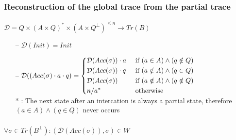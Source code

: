 \documentclass{beamer}
\begin{document}
\begin{frame}
\frametitle{Reconstruction of the global trace from the partial trace}
 \framesubtitle{}
 
 \begin{definition}
\scriptsize

$\mathcal{D}=Q\times(A\times Q)^*\times (A\times Q^\perp)^{\leq n}\longrightarrow Tr(B)$
\begin{itemize}
\scriptsize
\item[--] $\mathcal{D}(Init)=Init$
\item[--] $\mathcal{D}((Acc(\sigma)\cdot a \cdot q)=\begin{dcases}   
   \mathcal{D}(Acc(\sigma))\cdot a  &\text{ if } (a \in A) \wedge (q\notin Q)\\
   \mathcal{D}(Acc(\sigma))\cdot q  &\text{ if } (a \notin A) \wedge (q\in Q)\\
   \mathcal{D}(Acc(\sigma)) &\text{ if } (a \notin A) \wedge (q\notin Q)\\
   n/a^*  &\text{ otherwise } \\
   \end{dcases}$\\
\tiny   
* : The next state after an intercation is always a partial state, therefore $(a\in A)\wedge (q\in Q)$ never occurs
\end{itemize}

\end{definition}


\end{frame}





\begin{frame}
\frametitle{}
\framesubtitle{}

\begin{theorem}
\scriptsize
$\forall \sigma\in Tr(B^\perp): (\mathcal{D}(Acc(\sigma)),\sigma)\in W$
\end{theorem}

\end{frame}
\end{document}
